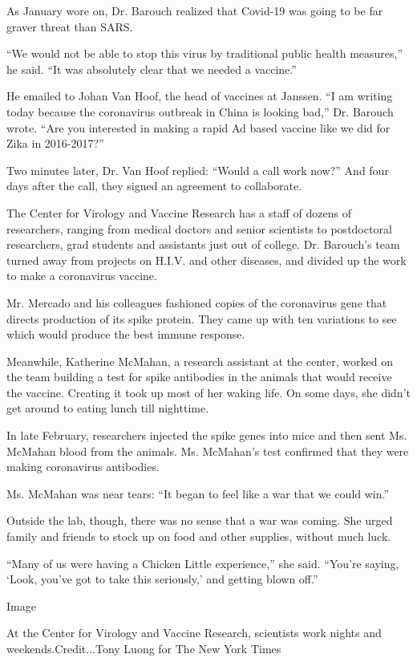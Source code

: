 As January wore on, Dr. Barouch realized that Covid-19 was going to be
far graver threat than SARS.

``We would not be able to stop this virus by traditional public health
measures,'' he said. ``It was absolutely clear that we needed a
vaccine.''

He emailed to Johan Van Hoof, the head of vaccines at Janssen. ``I am
writing today because the coronavirus outbreak in China is looking
bad,'' Dr. Barouch wrote. ``Are you interested in making a rapid Ad
based vaccine like we did for Zika in 2016-2017?''

Two minutes later, Dr. Van Hoof replied: ``Would a call work now?'' And
four days after the call, they signed an agreement to collaborate.

The Center for Virology and Vaccine Research has a staff of dozens of
researchers, ranging from medical doctors and senior scientists to
postdoctoral researchers, grad students and assistants just out of
college. Dr. Barouch's team turned away from projects on H.I.V. and
other diseases, and divided up the work to make a coronavirus vaccine.

Mr. Mercado and his colleagues fashioned copies of the coronavirus gene
that directs production of its spike protein. They came up with ten
variations to see which would produce the best immune response.

Meanwhile, Katherine McMahan, a research assistant at the center, worked
on the team building a test for spike antibodies in the animals that
would receive the vaccine. Creating it took up most of her waking life.
On some days, she didn't get around to eating lunch till nighttime.

In late February, researchers injected the spike genes into mice and
then sent Ms. McMahan blood from the animals. Ms. McMahan's test
confirmed that they were making coronavirus antibodies.

Ms. McMahan was near tears: ``It began to feel like a war that we could
win.''

Outside the lab, though, there was no sense that a war was coming. She
urged family and friends to stock up on food and other supplies, without
much luck.

``Many of us were having a Chicken Little experience,'' she said.
``You're saying, `Look, you've got to take this seriously,' and getting
blown off.''

Image

At the Center for Virology and Vaccine Research, scientists work nights
and weekends.Credit...Tony Luong for The New York Times


